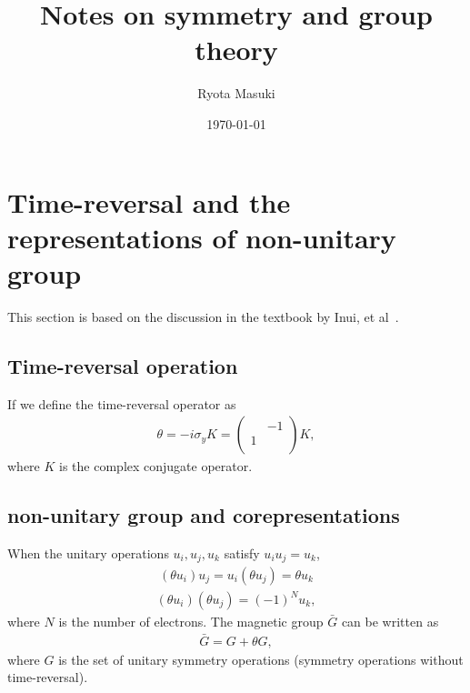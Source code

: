 \documentclass{article}
\title{Notes on symmetry and group theory}
\author{Ryota Masuki}
\date{\today}
\begin{document}
\maketitle

\section{Time-reversal and the representations of non-unitary group}
This section is based on the discussion in the textbook by Inui, et al~\cite{inui2012group}.

\subsection{Time-reversal operation}
If we define the time-reversal operator as
\begin{align}
  \theta = - i \sigma_y K = 
  \begin{pmatrix}
     & -1 \\
    1 &  \\
  \end{pmatrix}
  K,
\end{align}
where $K$ is the complex conjugate operator.

\subsection{non-unitary group and corepresentations}
When the unitary operations $u_i, u_j, u_k$ satisfy $u_i u_j = u_k$, 
\begin{align}
  (\theta u_i) u_j = u_i (\theta u_j) = \theta u_k
\end{align}
\begin{align}
  (\theta u_i) (\theta u_j) = (-1)^N u_k,
\end{align}
where $N$ is the number of electrons. The magnetic group $\bar{G}$ can be written as
\begin{align}
  \bar{G} = G + \theta G,
\end{align}
where $G$ is the set of unitary symmetry operations (symmetry operations without time-reversal).
\end{document}
